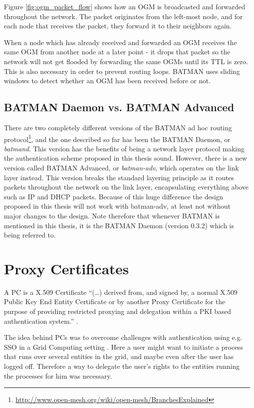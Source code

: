 Figure \ref{fig:ogm_packet_flow} shows how an \ac{OGM} is broadcasted and
forwarded throughout the network. The packet originates from the left-most node,
and for each node that receives the packet, they forward it to their neighbors
again.

When a node which has already received and forwarded an \ac{OGM} receives the
same \ac{OGM} from another node at a later point - it drops that packet so the
network will not get flooded by forwarding the same \acp{OGM} until its \ac{TTL}
is zero. This is also necessary in order to prevent routing loops. BATMAN uses
sliding windows to detect whether an \ac{OGM} has been received before or not.

\subsection{BATMAN Daemon vs. BATMAN Advanced}
There are two completely different versions of the BATMAN ad hoc routing
protocol\footnote{\url{http://www.open-mesh.org/wiki/open-mesh/BranchesExplained}},
and the one described so far has been the BATMAN Daemon, or \emph{batmand}. This
version has the benefits of being a network layer protocol making the
authentication scheme proposed in this thesis sound. However, there is a new
version called BATMAN Advanced, or \emph{batman-adv}, which operates on the
link layer instead. This version breaks the standard layering principle as it
routes packets throughout the network on the link layer, encapsulating
everything above such as IP and DHCP packets. Because of this huge difference
the design proposed in this thesis will not work with batman-adv, at least not
without major changes to the design. Note therefore that whenever BATMAN is
mentioned in this thesis, it is the BATMAN Daemon (version 0.3.2) which is
being referred to.

\section{Proxy Certificates}
\label{sect:pc}
A \acf{PC} is a X.509 Certificate ``(\ldots) derived from, and signed by, a
normal X.509 Public Key End Entity Certificate or by another Proxy Certificate
for the purpose of providing restricted proxying and delegation within a PKI
based authentication system.'' \cite{rfc3820}.

The idea behind \acp{PC} was to overcome challenges with authentication
using e.g. \ac{SSO} in a Grid Computing setting \cite{foster1998security}. Here
a user might want to initiate a process that runs over several entities in the
grid, and maybe even after the user has logged off. Therefore a way to delegate
the user's rights to the entities running the processes for him was necessary.

